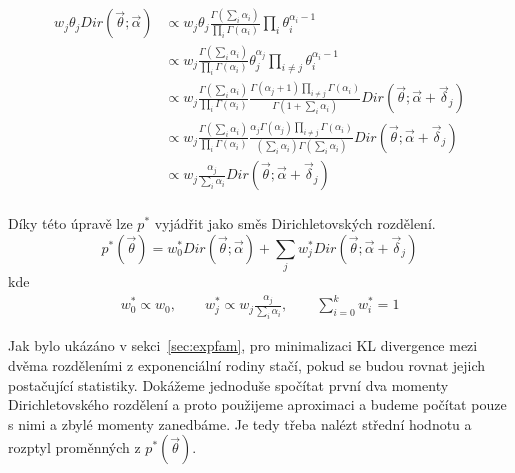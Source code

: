 \begin{align}
w_j \theta_j Dir(\vec{\theta}; \vec{\alpha}) &\propto
    w_j \theta_j \frac{\Gamma (\sum_i \alpha_{i})}{\prod_i \Gamma(\alpha_i)}
    \prod_i \theta_{i}^{\alpha_{i} - 1}
\label{eq:4}
\\
&\propto w_j \frac{\Gamma (\sum_i \alpha_{i})} {\prod_i
    \Gamma(\alpha_{i})} \theta_j^{\alpha_j} \prod_{i \ne j}
    \theta_{i}^{\alpha_{i} - 1} \\
&\propto w_j
    \frac{\Gamma (\sum_i \alpha_{i})}
         {\prod_i \Gamma(\alpha_{i})}
    \frac{\Gamma(\alpha_{j} + 1) \prod_{i \ne j} \Gamma(\alpha_i)}
         {\Gamma (1 + \sum_i \alpha_i)}
    Dir(\vec\theta; \vec{\alpha} + \vec{\delta}_j) \\
&\propto w_j
    \frac{\Gamma (\sum_i \alpha_{i})}
         {\prod_i \Gamma(\alpha_{i})}
    \frac{\alpha_j \Gamma(\alpha_j) \prod_{i \ne j} \Gamma(\alpha_i)}
         {(\sum_i \alpha_i) \Gamma (\sum_i \alpha_i)}
    Dir(\vec\theta; \vec{\alpha} + \vec{\delta}_j) \\
&\propto w_j
    \frac{\alpha_j}
         {\sum_i \alpha_i}
    Dir(\vec\theta; \vec{\alpha} + \vec{\delta}_j) \\
\end{align}

Díky této úpravě lze $p^*$ vyjádřit jako směs Dirichletovských rozdělení.
\begin{equation}
p^*(\vec{\theta}) =
    w_0^* Dir(\vec{\theta}; \vec{\alpha}) +
    \sum_j w^*_j
        Dir(\vec{\theta}; \vec{\alpha} + \vec{\delta}_j)
\label{eq:marginaltheta}
\end{equation}
kde
\begin{align}
    w^*_0 \propto w_0, \quad \quad
    w^*_j \propto w_j \frac{\alpha_j}{\sum_i \alpha_i}, \quad \quad
    \sum_{i=0}^k w_i^* = 1
\end{align}

Jak bylo ukázáno v sekci~\ref{sec:expfam}, pro minimalizaci KL divergence mezi dvěma rozděleními z exponenciální rodiny
stačí, pokud se budou rovnat jejich postačující statistiky. Dokážeme jednoduše
spočítat první dva momenty Dirichletovského rozdělení a proto použijeme
aproximaci a budeme počítat pouze s nimi a zbylé momenty zanedbáme.
Je tedy třeba nalézt střední hodnotu a rozptyl proměnných z $p^*(\vec\theta)$.


